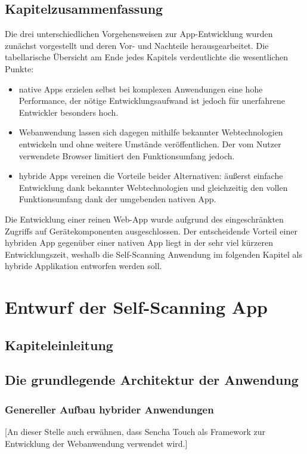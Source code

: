 \section{Kapitelzusammenfassung}
Die drei unterschiedlichen Vorgehensweisen zur App-Entwicklung wurden zunächst vorgestellt und deren Vor- und Nachteile herausgearbeitet. Die tabellarische Übersicht am Ende jedes Kapitels verdeutlichte die wesentlichen Punkte:
\begin{itemize}
	\item native Apps erzielen selbst bei komplexen Anwendungen eine hohe Performance, der nötige Entwicklungsaufwand ist jedoch für unerfahrene Entwickler besonders hoch.
	\item Webanwendung lassen sich dagegen mithilfe bekannter Webtechnologien entwickeln und ohne weitere Umstände veröffentlichen. Der vom Nutzer verwendete Browser limitiert den Funktionsumfang jedoch.
	\item hybride Apps vereinen die Vorteile beider Alternativen: äußerst einfache Entwicklung dank bekannter Webtechnologien und gleichzeitig den vollen Funktionsumfang dank der umgebenden nativen App.
\end{itemize} 

Die Entwicklung einer reinen Web-App wurde aufgrund des eingeschränkten Zugriffs auf Gerätekomponenten ausgeschlossen. Der entscheidende Vorteil einer hybriden App gegenüber einer nativen App liegt in der sehr viel kürzeren Entwicklungszeit, weshalb die Self-Scanning Anwendung im folgenden Kapitel als hybride Applikation entworfen werden soll.

\chapter{Entwurf der Self-Scanning App}
\section{Kapiteleinleitung}


\section{Die grundlegende Architektur der Anwendung}
\subsection{Genereller Aufbau hybrider Anwendungen}
[An dieser Stelle auch erwähnen, dass Sencha Touch als Framework zur Entwicklung der Webanwendung verwendet wird.]

